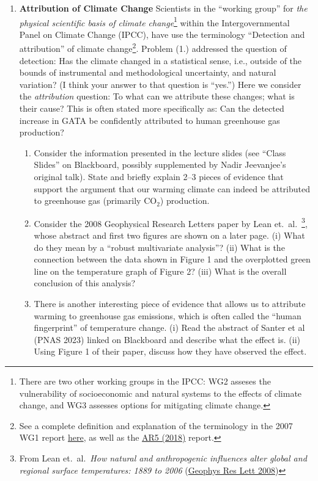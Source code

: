 \documentclass[12pt]{article}
\begin{document}
\begin{enumerate}
\item {\bf Attribution of Climate Change} Scientists in the ``working group'' for {\em the physical scientific basis of climate change}\footnote{There are two other working groups in the IPCC: WG2 asseses the vulnerability of socioeconomic and natural systems to the effects of climate change, and WG3  assesses options for mitigating climate change.} within the Intergovernmental Panel on Climate Change (IPCC), have use the terminology ``Detection and attribution'' of climate change\footnote{See a complete definition and explanation of the terminology in the 2007 WG1 report \href{https://archive.ipcc.ch/publications_and_data/ar4/wg1/en/ch9s9-1-2.html}{here}, as well as the \href{https://www.ipcc.ch/site/assets/uploads/2018/02/WG1AR5_Chapter10_FINAL.pdf}{AR5 (2018)} report.}.  Problem (1.) addressed the question of detection: Has the climate changed in a statistical sense, i.e., outside of the bounds of instrumental and methodological uncertainty, and natural variation? (I think your answer to that question is ``yes.'')  Here we consider the {\em attribution} question: To what can we attribute these changes; what is their cause?  This is often stated more specifically as: Can the detected increase in GATA be confidently attributed to human greenhouse gas production?
	\begin{enumerate} 
	\item Consider the information presented in the lecture slides (see ``Class Slides'' on Blackboard, possibly supplemented by Nadir Jeevanjee's original talk).  State and briefly explain 2--3 pieces of evidence that support the argument that our warming climate can indeed be attributed to greenhouse gas (primarily $\text{CO}_2$) production.
	\item Consider the 2008  Geophysical Research Letters paper by Lean et.\ al.\ \footnote{From Lean et.\ al.\ {\em How natural and anthropogenic influences alter global and regional surface temperatures: 1889 to 2006} (\href{https://agupubs.onlinelibrary.wiley.com/doi/full/10.1029/2008GL034864}{Geophys Res Lett 2008})}, whose abstract and first two figures are shown on a later page.  (i) What do they mean by a ``robust multivariate analysis''?  (ii) What is the connection between the data shown in Figure 1 and the overplotted green line on the temperature graph of Figure 2?  (iii) What is the overall conclusion of this analysis?
	\item There is another interesting piece of evidence that allows us to attribute warming to greenhouse gas emissions, which is often called the ``human fingerprint'' of temperature change.  (i) Read the abstract of Santer et al (PNAS 2023) linked on Blackboard and describe what the effect is. (ii) Using Figure 1 of their paper, discuss how they have observed the effect.
	\end{enumerate}


\end{enumerate}
\end{document}
